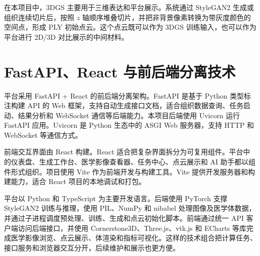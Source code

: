 在本项目中，3DGS 主要用于三维表达和平台展示。系统通过 StyleGAN2 生成或组织连续切片后，按照 $z$ 轴顺序堆叠切片，并把非背景像素转换为带灰度颜色的空间点，形成 PLY 初始点云。这个点云既可以作为 3DGS 训练输入，也可以作为平台进行 2D/3D 对比展示的中间材料。

\section{FastAPI、React 与前后端分离技术}
平台采用 FastAPI + React 的前后端分离架构。FastAPI 是基于 Python 类型标注构建 API 的 Web 框架，支持自动生成接口文档，适合组织数据查询、任务启动、结果分析和 WebSocket 通信等后端能力。本项目后端使用 Uvicorn 运行 FastAPI 应用。Uvicorn 是 Python 生态中的 ASGI Web 服务器，支持 HTTP 和 WebSocket 等通信方式。

前端交互界面由 React 构建。React 适合把复杂界面拆分为可复用组件。平台中的仪表盘、生成工作台、医学影像查看器、任务中心、点云展示和 AI 助手都以组件形式组织。项目使用 Vite 作为前端开发与构建工具。Vite 提供开发服务器和构建能力，适合 React 项目的本地调试和打包。

平台以 Python 和 TypeScript 为主要开发语言。后端使用 PyTorch 支撑 StyleGAN2 训练与推理，使用 PIL、NumPy 和 nibabel 处理图像及医学体数据，并通过子进程调度预处理、训练、生成和点云初始化脚本。前端通过统一 API 客户端访问后端接口，并使用 Cornerstone3D、Three.js、vtk.js 和 ECharts 等库完成医学影像浏览、点云展示、体渲染和指标可视化。这样的技术组合把计算任务、接口服务和浏览器交互分开，后续维护和展示也更方便。
